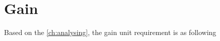 \newcommand{\reqgain}{The delay unit must delay the input signal, in time defined by external unit.}

\section{Gain}
Based on the \autoref{ch:analysing}, the gain unit requirement is as following

\begin{requirement}\label{req:gain_ex}
\end{requirement}



